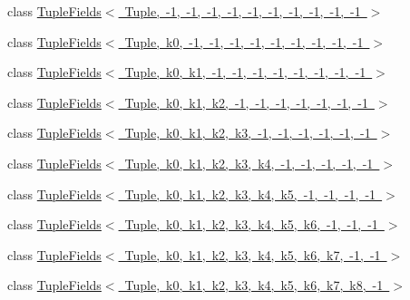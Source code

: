 \begin{DoxyCompactItemize}
class \mbox{\hyperlink{classtesting_1_1internal_1_1TupleFields_3_01Tuple_00_01-1_00_01-1_00_01-1_00_01-1_00_01-1_00_01-e023d39d312048e71832a898e9e07f70}{Tuple\+Fields$<$ Tuple, -\/1, -\/1, -\/1, -\/1, -\/1, -\/1, -\/1, -\/1, -\/1, -\/1 $>$}}
\item 
class \mbox{\hyperlink{classtesting_1_1internal_1_1TupleFields_3_01Tuple_00_01k0_00_01-1_00_01-1_00_01-1_00_01-1_00_01-d80da5b2d6dff94ddefe7f2fc2de778d}{Tuple\+Fields$<$ Tuple, k0, -\/1, -\/1, -\/1, -\/1, -\/1, -\/1, -\/1, -\/1, -\/1 $>$}}
\item 
class \mbox{\hyperlink{classtesting_1_1internal_1_1TupleFields_3_01Tuple_00_01k0_00_01k1_00_01-1_00_01-1_00_01-1_00_01-fb5812c507091ce72ac353453b83394d}{Tuple\+Fields$<$ Tuple, k0, k1, -\/1, -\/1, -\/1, -\/1, -\/1, -\/1, -\/1, -\/1 $>$}}
\item 
class \mbox{\hyperlink{classtesting_1_1internal_1_1TupleFields_3_01Tuple_00_01k0_00_01k1_00_01k2_00_01-1_00_01-1_00_01-d40fb0064dd627afc9c2b7f6513ffcb3}{Tuple\+Fields$<$ Tuple, k0, k1, k2, -\/1, -\/1, -\/1, -\/1, -\/1, -\/1, -\/1 $>$}}
\item 
class \mbox{\hyperlink{classtesting_1_1internal_1_1TupleFields_3_01Tuple_00_01k0_00_01k1_00_01k2_00_01k3_00_01-1_00_01-5ce285d726b58f03354f318c4712939e}{Tuple\+Fields$<$ Tuple, k0, k1, k2, k3, -\/1, -\/1, -\/1, -\/1, -\/1, -\/1 $>$}}
\item 
class \mbox{\hyperlink{classtesting_1_1internal_1_1TupleFields_3_01Tuple_00_01k0_00_01k1_00_01k2_00_01k3_00_01k4_00_01-111caa1fee55a41736499c292bb1a612}{Tuple\+Fields$<$ Tuple, k0, k1, k2, k3, k4, -\/1, -\/1, -\/1, -\/1, -\/1 $>$}}
\item 
class \mbox{\hyperlink{classtesting_1_1internal_1_1TupleFields_3_01Tuple_00_01k0_00_01k1_00_01k2_00_01k3_00_01k4_00_01k15c11b8436218f7eb1523adb30f3f284}{Tuple\+Fields$<$ Tuple, k0, k1, k2, k3, k4, k5, -\/1, -\/1, -\/1, -\/1 $>$}}
\item 
class \mbox{\hyperlink{classtesting_1_1internal_1_1TupleFields_3_01Tuple_00_01k0_00_01k1_00_01k2_00_01k3_00_01k4_00_01keabdf503bd0192bc35ddb795df95316f}{Tuple\+Fields$<$ Tuple, k0, k1, k2, k3, k4, k5, k6, -\/1, -\/1, -\/1 $>$}}
\item 
class \mbox{\hyperlink{classtesting_1_1internal_1_1TupleFields_3_01Tuple_00_01k0_00_01k1_00_01k2_00_01k3_00_01k4_00_01kb66bdb5aa3faae197a495470a1b8e9d1}{Tuple\+Fields$<$ Tuple, k0, k1, k2, k3, k4, k5, k6, k7, -\/1, -\/1 $>$}}
\item 
class \mbox{\hyperlink{classtesting_1_1internal_1_1TupleFields_3_01Tuple_00_01k0_00_01k1_00_01k2_00_01k3_00_01k4_00_01k478398ee7a3c50306b8ce1483964573e}{Tuple\+Fields$<$ Tuple, k0, k1, k2, k3, k4, k5, k6, k7, k8, -\/1 $>$}}

\end{DoxyCompactItemize}
